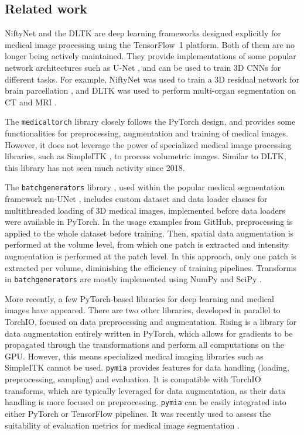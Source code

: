 \subsection{Related work}

NiftyNet \cite{gibson_niftynet_2018} and the \ac{DLTK} \cite{pawlowski_dltk_2017} are deep learning frameworks designed explicitly for medical image processing using the TensorFlow~1 platform.
Both of them are no longer being actively maintained.
They provide implementations of some popular network architectures such as U-Net \cite{cicek_3d_2016}, and can be used to train 3D \acp{CNN} for different tasks.
For example, NiftyNet was used to train a 3D residual network for brain parcellation \cite{li_compactness_2017}, and \ac{DLTK} was used to perform multi-organ segmentation on \ac{CT} and \ac{MRI} \cite{valindria_multi-modal_2018}.

The \texttt{medicaltorch} library \cite{christian_s_perone_peronemedicaltorch_2018} closely follows the PyTorch design, and provides some functionalities for preprocessing, augmentation and training of medical images.
However, it does not leverage the power of specialized medical image processing libraries, such as SimpleITK \cite{lowekamp_design_2013}, to process volumetric images.
Similar to \ac{DLTK}, this library has not seen much activity since 2018.

The \texttt{batchgenerators} library \cite{isensee_batchgenerators_2020}, used within the popular medical segmentation framework nn-UNet \cite{isensee_nnu-net_2021}, includes custom dataset and data loader classes for multithreaded loading of 3D medical images, implemented before data loaders were available in PyTorch.
In the usage examples from GitHub, preprocessing is applied to the whole dataset before training.
Then, spatial data augmentation is performed at the volume level, from which one patch is extracted and intensity augmentation is performed at the patch level.
In this approach, only one patch is extracted per volume, diminishing the efficiency of training pipelines.
Transforms in \texttt{batchgenerators} are mostly implemented using NumPy \cite{van_der_walt_numpy_2011} and SciPy \cite{virtanen_scipy_2020}.

More recently, a few PyTorch-based libraries for deep learning and medical images have appeared.
There are two other libraries, developed in parallel to TorchIO, focused on data preprocessing and augmentation.
Rising is a library for data augmentation entirely written in PyTorch, which allows for gradients to be propagated through the transformations and perform all computations on the \ac{GPU}.
However, this means specialized medical imaging libraries such as SimpleITK cannot be used.
\texttt{pymia} \cite{jungo_pymia_2021} provides features for data handling (loading, preprocessing, sampling) and evaluation.
It is compatible with TorchIO transforms, which are typically leveraged for data augmentation, as their data handling is more focused on preprocessing.
\texttt{pymia} can be easily integrated into either PyTorch or TensorFlow pipelines.
It was recently used to assess the suitability of evaluation metrics for medical image segmentation \cite{kofler_are_2021}.

